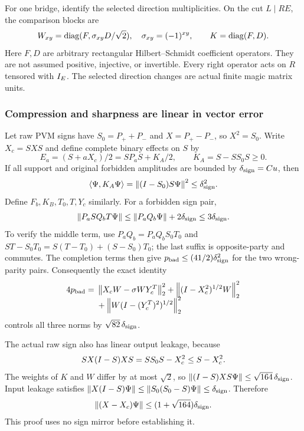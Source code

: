 For one bridge, identify the selected direction multiplicities. On the cut $L\mid RE$, the comparison blocks are
\begin{equation}\label{dec:eq:blocks}
W_{xy}=\operatorname{diag}(F,\sigma_{xy}D/\sqrt2),\quad
\sigma_{xy}=(-1)^{xy},\qquad K=\operatorname{diag}(F,D).
\end{equation}
Here $F,D$ are arbitrary rectangular Hilbert--Schmidt coefficient operators. They are not assumed positive, injective, or invertible. Every right operator acts on $R$ tensored with $I_E$. The selected direction changes are actual finite magic matrix units.

\subsubsection{Compression and sharpness are linear in vector error}
Let raw PVM signs have $S_0=P_++P_-$ and $X=P_+-P_-$, so $X^2=S_0$. Write $X_c=SXS$ and define complete binary effects on $S$ by
\[
E_a=(S+aX_c)/2=SP_aS+K_A/2,\qquad K_A=S-SS_0S\ge0.
\]
If all support and original forbidden amplitudes are bounded by $\delta_{\rm sign}=Cu$, then
\[
\left\langle\Psi,K_A\Psi\right\rangle=\left\lVert(I-S_0)S\Psi\right\rVert^2\le \delta_{\rm sign}^2.
\]
Define $F_b,K_B,T_0,T,Y_c$ similarly. For a forbidden sign pair,
\[
\left\lVert P_aSQ_bT\Psi\right\rVert\le\left\lVert P_aQ_b\Psi\right\rVert+2\delta_{\rm sign}\le3\delta_{\rm sign}.
\]
To verify the middle term, use $P_aQ_b=P_aQ_bS_0T_0$ and
$ST-S_0T_0=S(T-T_0)+(S-S_0)T_0$; the last suffix is opposite-party and commutes. The completion terms then give
$p_{\rm bad}\le(41/2)\delta_{\rm sign}^2$ for the two wrong-parity pairs. Consequently the exact identity
\begin{align}\label{dec:eq:sharp}
4p_{\rm bad}={}&\left\lVert X_cW-\sigma WY_c^T\right\rVert_2^2
+\left\lVert(I-X_c^2)^{1/2}W\right\rVert_2^2\\[-2mm]
&+\left\lVert W(I-(Y_c^T)^2)^{1/2}\right\rVert_2^2\nonumber
\end{align}
controls all three norms by $\sqrt{82}\,\delta_{\rm sign}$.

The actual raw sign also has linear output leakage, because
\[
SX(I-S)XS=SS_0S-X_c^2\le S-X_c^2.
\]
The weights of $K$ and $W$ differ by at most $\sqrt2$, so
$\left\lVert(I-S)XS\Psi\right\rVert\le\sqrt{164}\,\delta_{\rm sign}$. Input leakage satisfies
$\left\lVert X(I-S)\Psi\right\rVert\le\left\lVert S_0(S_0-S)\Psi\right\rVert\le \delta_{\rm sign}$.
Therefore
\begin{equation}\label{dec:eq:signleak}
\left\lVert(X-X_c)\Psi\right\rVert\le(1+\sqrt{164})\delta_{\rm sign}.
\end{equation}
This proof uses no sign mirror before establishing it.

